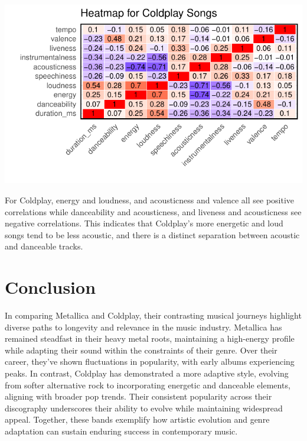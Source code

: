 \documentclass[11pt,preprint, authoryear]{elsarticle}
\let\origfigure\figure
\let\endorigfigure\endfigure
\renewenvironment{figure}[1][2] {
    \expandafter\origfigure\expandafter[H]
} {
    \endorigfigure
}
\numberwithin{equation}{section}
\numberwithin{figure}{section}
\numberwithin{table}{section}
\begin{document}
\begin{figure}[H]

{\centering \includegraphics{Question2_files/figure-latex/Figure5-1} 

}

\caption{Heatmap of Coldplays musical attributes\label{Figure5}}\label{fig:Figure5}
\end{figure}

For Coldplay, energy and loudness, and acousticness and valence all see
positive correlations while danceability and acousticness, and liveness
and acousticness see negative correlations. This indicates that
Coldplay's more energetic and loud songs tend to be less acoustic, and
there is a distinct separation between acoustic and danceable tracks.

\section{Conclusion}\label{conclusion}

In comparing Metallica and Coldplay, their contrasting musical journeys
highlight diverse paths to longevity and relevance in the music
industry. Metallica has remained steadfast in their heavy metal roots,
maintaining a high-energy profile while adapting their sound within the
constraints of their genre. Over their career, they've shown
fluctuations in popularity, with early albums experiencing peaks. In
contrast, Coldplay has demonstrated a more adaptive style, evolving from
softer alternative rock to incorporating energetic and danceable
elements, aligning with broader pop trends. Their consistent popularity
across their discography underscores their ability to evolve while
maintaining widespread appeal. Together, these bands exemplify how
artistic evolution and genre adaptation can sustain enduring success in
contemporary music.


\end{document}

